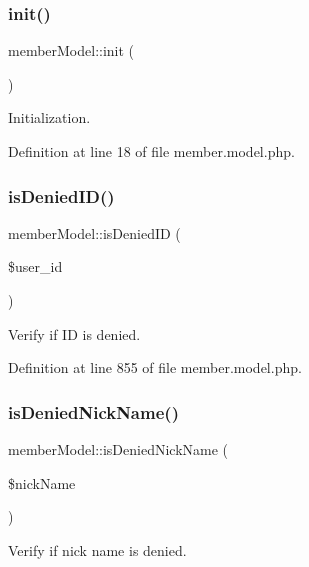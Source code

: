 \subsubsection{\texorpdfstring{init()}{init()}}
{\footnotesize\ttfamily member\+Model\+::init (\begin{DoxyParamCaption}{ }\end{DoxyParamCaption})}



Initialization. 



Definition at line 18 of file member.\+model.\+php.

\hypertarget{classmemberModel_ac0ba5ea00ecf3113fe50947243a6be20}{}\label{classmemberModel_ac0ba5ea00ecf3113fe50947243a6be20} 
\subsubsection{\texorpdfstring{is\+Denied\+I\+D()}{isDeniedID()}}
{\footnotesize\ttfamily member\+Model\+::is\+Denied\+ID (\begin{DoxyParamCaption}\item[{}]{\$user\+\_\+id }\end{DoxyParamCaption})}



Verify if ID is denied. 



Definition at line 855 of file member.\+model.\+php.

\hypertarget{classmemberModel_a8d1d937176417d4d29a48404feb7f32f}{}\label{classmemberModel_a8d1d937176417d4d29a48404feb7f32f} 
\subsubsection{\texorpdfstring{is\+Denied\+Nick\+Name()}{isDeniedNickName()}}
{\footnotesize\ttfamily member\+Model\+::is\+Denied\+Nick\+Name (\begin{DoxyParamCaption}\item[{}]{\$nick\+Name }\end{DoxyParamCaption})}



Verify if nick name is denied. 



